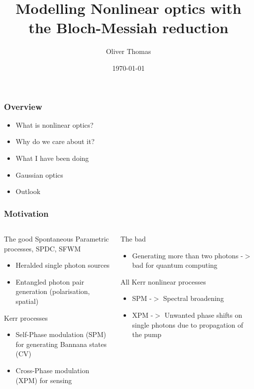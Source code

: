 \documentclass{beamer}
\title{Modelling Nonlinear optics with the Bloch-Messiah reduction}
\author{Oliver Thomas}
\institute{Quantum Engineering CDT \\ University of Bristol}
\date{\today}
\begin{document}
\frame{\titlepage}

\begin{frame}
\frametitle{Overview}
\begin{itemize}
	\item What is nonlinear optics?
    \item Why do we care about it?
    \item What I have been doing
    \item Gaussian optics 
    \item Outlook
\end{itemize}
\end{frame}

\begin{frame}
\frametitle{Motivation}
\begin{columns}
    \begin{block}{The good}
    Spontaneous Parametric processes, SPDC, SFWM
    \begin{itemize}
        \item Heralded single photon sources
        \item Entangled photon pair generation (polarisation, spatial)
    \end{itemize}
    Kerr processes 
    \begin{itemize}
        \item Self-Phase modulation (SPM) for generating Bannana states (CV)
        \item Cross-Phase modulation (XPM) for sensing
    \end{itemize}
    \end{block}
%
    \begin{block}{The bad}
        \begin{itemize}
            \item Generating more than two photons -$>$ bad for quantum computing
        \end{itemize}
        All Kerr nonlinear processes 
        \begin{itemize}
            \item SPM -$>$ Spectral broadening
            \item XPM -$>$ Unwanted phase shifts on single photons due to propagation of the pump 
        \end{itemize}
        \end{block}
\end{columns}

\end{frame}
\end{document}
